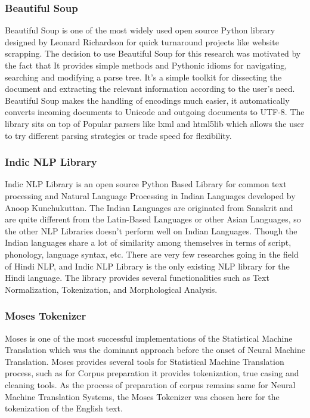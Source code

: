 \subsubsection{Beautiful Soup}
Beautiful Soup is one of the most widely used open source Python library designed by Leonard Richardson for quick turnaround projects like website scrapping. The decision to use Beautiful Soup for this research was motivated by the fact that It provides simple methods and Pythonic idioms for navigating, searching and modifying a parse tree. It’s a simple toolkit for dissecting the document and extracting the relevant information according to the user’s need. Beautiful Soup makes the handling of encodings much easier, it automatically converts incoming documents to Unicode and outgoing documents to UTF-8. The library sits on top of Popular parsers like lxml and html5lib which allows the user to try different parsing strategies or trade speed for flexibility. 
\subsubsection{Indic NLP Library}
Indic NLP Library is an open source Python Based Library for common text processing and Natural Language Processing in Indian Languages developed by Anoop Kunchukuttan.  The Indian Languages are originated from Sanskrit and are quite different from the Latin-Based Languages or other Asian Languages, so the other NLP Libraries doesn’t perform well on Indian Languages. Though the Indian languages share a lot of similarity among themselves in terms of script, phonology, language syntax, etc. There are very few researches going in the field of Hindi NLP, and Indic NLP Library is the only existing NLP library for the Hindi language. The library provides several functionalities such as Text Normalization, Tokenization, and Morphological Analysis.
\subsubsection{Moses Tokenizer}
Moses is one of the most successful implementations of the Statistical Machine Translation which was the dominant approach before the onset of Neural Machine Translation. Moses provides several tools for Statistical Machine Translation process, such as for Corpus preparation it provides tokenization, true casing and cleaning tools. As the process of preparation of corpus remains same for Neural Machine Translation Systems, the Moses Tokenizer was chosen here for the tokenization of the English text. 
